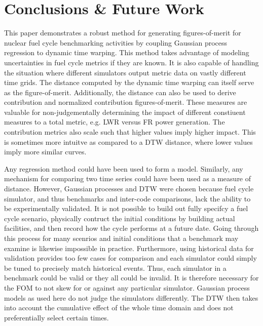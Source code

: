 \section{Conclusions \& Future Work}
\label{conclusion}

This paper demonstrates a robust method for generating figures-of-merit
for nuclear fuel cycle benchmarking activities by coupling Gaussian process
regression to dynamic time warping. This method takes advantage of modeling
uncertainties in fuel cycle metrics if they are known. It is also capable 
of handling the situation where different simulators output metric data on
vastly different time grids. The distance computed by the dynamic time 
warping can itself serve as the figure-of-merit. Additionally, the 
distance can also be used to derive contribution and normalized contribution
figures-of-merit. These measures are valuable for non-judgementally 
determining the impact of different constiuent measures to a total 
metric, e.g. LWR versus FR power generation. The contribution metrics also 
scale such that higher values imply higher impact. This is sometimes
more intuitve as compared to a DTW distance, where lower values imply
more similar curves.

Any regression method could have been used to form a model. Similarly, any
mechanism for comparing two time series could have been used as a measure
of distance.  However, Gaussian processes and DTW were chosen because
fuel cycle simulator, and thus benchmarks and inter-code comparisons, lack 
the ability to be experimentally validated.
It is not possible to build out fully specifcy a fuel cycle scenario,
physically contruct the initial conditions by building actual facilities, 
and then record how the cycle performs at a future date. 
Going through this process for many scenrios and initial conditions that 
a benchmark may examine is likewise impossible in practice.
Furthermore, using 
historical data for validation provides too few cases for comparison and 
each simulator could simply be tuned to precisely match historical events.
Thus, each simulator in a benchmark could be valid or they all could be 
invalid. It is therefore necessary for the FOM to not skew for or against 
any particular simulator. Gaussian process models as used here do not 
judge the simulators differently. The DTW then takes into account the 
cumulative effect of the whole time domain and does not preferentially 
select certain times.

